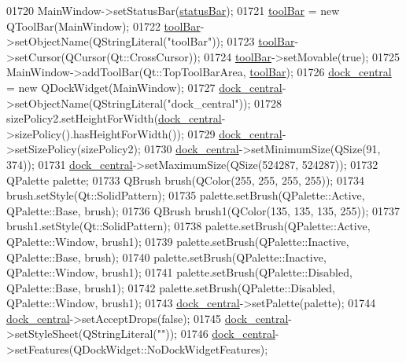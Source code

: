 \begin{DoxyCode}
01720         MainWindow->setStatusBar(\hyperlink{a00080_a50fa481337604bcc8bf68de18ab16ecd}{statusBar});
01721         \hyperlink{a00080_ab84dc49349f514d7b7d3fe8e78de069b}{toolBar} = \textcolor{keyword}{new} QToolBar(MainWindow);
01722         \hyperlink{a00080_ab84dc49349f514d7b7d3fe8e78de069b}{toolBar}->setObjectName(QStringLiteral(\textcolor{stringliteral}{"toolBar"}));
01723         \hyperlink{a00080_ab84dc49349f514d7b7d3fe8e78de069b}{toolBar}->setCursor(QCursor(Qt::CrossCursor));
01724         \hyperlink{a00080_ab84dc49349f514d7b7d3fe8e78de069b}{toolBar}->setMovable(\textcolor{keyword}{true});
01725         MainWindow->addToolBar(Qt::TopToolBarArea, \hyperlink{a00080_ab84dc49349f514d7b7d3fe8e78de069b}{toolBar});
01726         \hyperlink{a00080_a19105d0d919fa33b5f29f7677bbab054}{dock\_central} = \textcolor{keyword}{new} QDockWidget(MainWindow);
01727         \hyperlink{a00080_a19105d0d919fa33b5f29f7677bbab054}{dock\_central}->setObjectName(QStringLiteral(\textcolor{stringliteral}{"dock\_central"}));
01728         sizePolicy2.setHeightForWidth(\hyperlink{a00080_a19105d0d919fa33b5f29f7677bbab054}{dock\_central}->sizePolicy().hasHeightForWidth());
01729         \hyperlink{a00080_a19105d0d919fa33b5f29f7677bbab054}{dock\_central}->setSizePolicy(sizePolicy2);
01730         \hyperlink{a00080_a19105d0d919fa33b5f29f7677bbab054}{dock\_central}->setMinimumSize(QSize(91, 374));
01731         \hyperlink{a00080_a19105d0d919fa33b5f29f7677bbab054}{dock\_central}->setMaximumSize(QSize(524287, 524287));
01732         QPalette palette;
01733         QBrush brush(QColor(255, 255, 255, 255));
01734         brush.setStyle(Qt::SolidPattern);
01735         palette.setBrush(QPalette::Active, QPalette::Base, brush);
01736         QBrush brush1(QColor(135, 135, 135, 255));
01737         brush1.setStyle(Qt::SolidPattern);
01738         palette.setBrush(QPalette::Active, QPalette::Window, brush1);
01739         palette.setBrush(QPalette::Inactive, QPalette::Base, brush);
01740         palette.setBrush(QPalette::Inactive, QPalette::Window, brush1);
01741         palette.setBrush(QPalette::Disabled, QPalette::Base, brush1);
01742         palette.setBrush(QPalette::Disabled, QPalette::Window, brush1);
01743         \hyperlink{a00080_a19105d0d919fa33b5f29f7677bbab054}{dock\_central}->setPalette(palette);
01744         \hyperlink{a00080_a19105d0d919fa33b5f29f7677bbab054}{dock\_central}->setAcceptDrops(\textcolor{keyword}{false});
01745         \hyperlink{a00080_a19105d0d919fa33b5f29f7677bbab054}{dock\_central}->setStyleSheet(QStringLiteral(\textcolor{stringliteral}{""}));
01746         \hyperlink{a00080_a19105d0d919fa33b5f29f7677bbab054}{dock\_central}->setFeatures(QDockWidget::NoDockWidgetFeatures);

\end{DoxyCode}
